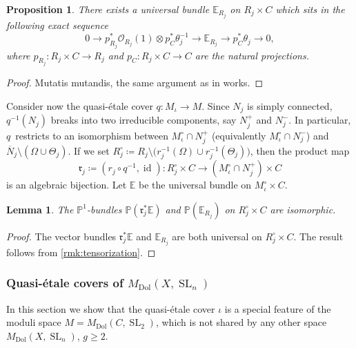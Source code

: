 \documentclass[JEP,XML,SOM,Unicode, NoEqCountersInSection,NoFloatCountersInSection,published]{cedram}
\let\mathcal\mathscr
\newtheorem{lem}[thm]{Lemma}
\newtheorem{prop}[thm]{Proposition}
\theoremstyle{definition}
\newcommand{\PP}{\mathbb{P}}
\newcommand{\Sl}{\operatorname{SL}}
\newcommand{\id}{\operatorname{id}}
\newcommand{\MDolSl}{{M}_{\mathrm{Dol}}(X, \Sl_n)}
\let\NBun N
\let\Rcomp R
\begin{document}
\begin{prop}\label{prop:universalbundleRj}
There exists a universal bundle $\mathbb{E}_{\Rcomp_j}$ on $\Rcomp_j \times C$ which sits in the following exact sequence
\[
0 \to p_{\Rcomp_j}^* \mathcal{O}_{\Rcomp_j}(1) \otimes p_C^*\theta^{-1}_j \to \mathbb{E}_{\Rcomp_j} \to p_C^*\theta_j \to 0,
\]
where $p_{\Rcomp_j}\colon \Rcomp_j \times C \to \Rcomp_j$ and $p_C\colon \Rcomp_j \times C \to C$ are the natural projections.
\end{prop}
\begin{proof}
Mutatis mutandis, the same argument as in \cite[p.\,22]{Thaddeus89} works.
\end{proof}

Consider now the quasi-étale cover $q\colon M_{\iota} \to M$. Since $\NBun_j$ is simply connected, $q^{-1}(\NBun_j)$ breaks into two irreducible components, say $\NBun^{+}_j$ and $\NBun^{-}_j$. In particular, $q$~restricts to an isomorphism between $M^{\circ}_{\iota} \cap \NBun^{+}_j$ (equivalently $M^{\circ}_{\iota} \cap \NBun^{-}_j$) and \hbox{$\overline{\NBun}_j \setminus( \Omega \cup \Theta_j)$}. If we set $\Rcomp^{\circ}_j \coloneqq \Rcomp_j \setminus \big(r^{-1}_j(\Omega) \cup r^{-1}_j(\Theta_j)\big)$, then the product map \begin{equation}\label{eq:Rj}
\mathfrak{r}_j \coloneqq (r_j \circ q^{-1}, \id)\colon\Rcomp^{\circ}_j \times C \to (M^{\circ}_{\iota} \cap \NBun^{+}_j) \times C
\end{equation}
is an algebraic bijection.
Let $\mathbb{E}$ be the universal bundle on $M^{\circ}_{\iota} \times C$.
\begin{lem}\label{lem:equivalenceP1bundles}
The $\PP^1$-bundles $\PP(\mathfrak{r}^*_j\mathbb{E})$ and $\PP(\mathbb{E}_{\Rcomp_j})$ on $\Rcomp^{\circ}_j \times C$ are isomorphic.
\end{lem}
\begin{proof} The vector bundles $\mathfrak{r}^*_j\mathbb{E}$ and $\mathbb{E}_{\Rcomp_j}$ are both universal on $\Rcomp^{\circ}_j \times C$. The result follows from \cref{rmk:tensorization}.
\end{proof}

\subsubsection{Quasi-étale covers of $\MDolSl$}\label{sec:quasi-etalecover}
In this section we show that the quasi-étale cover $\iota$ is a special feature of the moduli space $M={M}_{\mathrm{Dol}}(C,\Sl_2)$, which is not shared by any other space $\MDolSl$, $g \geq 2$.
\end{document}

